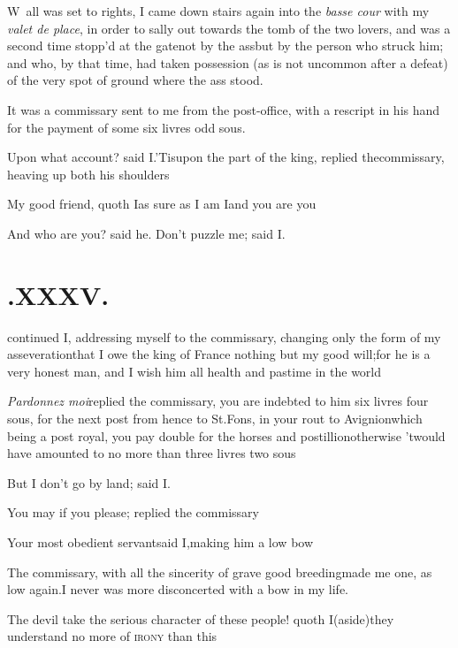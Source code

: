 \documentclass{article}
\begin{document}
\lettrine{W}{\,} all was set to rights, I came
down stairs again into the \textit{basse cour} with my \textit{valet de
place}, in order to sally out towards the tomb of the two
lovers, \etc\tsk and was a second time stopp’d at the
gate\tsh not by the ass\tsk but by the person who struck
him; and who, by that time, had taken possession (as is not
uncommon after a defeat) of the very spot of ground where the ass
stood.

It was a commissary sent to me from the post-office, with a
rescript in his hand for the payment of some six livres odd
sous.

Upon what account? said I.\tsh ’Tis\break upon the part
of the king, replied the\pb commissary, heaving up both his
shoulders\tsh

\tsh My good friend, quoth I\tsh as sure as I
am I\tsk and you are you\tsh

\tsh And who are you? said he.\tsh\break
\tsh Don’t puzzle me; said I.

\section{.\enspace XXXV.}

\noindent
{}
continued I, addressing myself to the commissary, changing only
the form of my asseveration\tsh that I owe the king of France
nothing but my good will;\break for he is a very honest man, and
I wish him all health and pastime in the world\tsh

\textit{Pardonnez moi}\tsk replied the commissary, you are
indebted to him six livres\pb
four sous, for the next post from hence to St.\@ Fons, in your
rout to Avignion\tsk which being a post royal, you pay double
for the horses and postillion\tsk otherwise ’twould have
amounted to no more than three livres two sous\tsh

\tsh But I don’t go by land; said I.

\tsh You may if you please; replied the commissary\tsh

Your most obedient servant\tsh said I,\break making him a low bow\tsh

The commissary, with all the sincerity of grave good breeding\tsk made me one, as low
again.\tsh I never was more disconcerted with a bow in my life.

\tsh The devil take the serious character of these
people! quoth I\tsk (aside)\pb they understand no more of \textsc{irony} than
this\tsh
\end{document}
